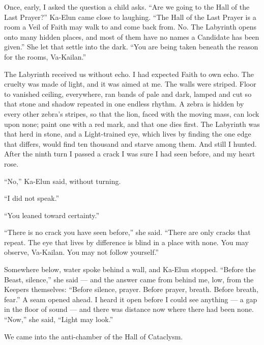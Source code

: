 Once, early, I asked the question a child asks. ``Are we going to the Hall of the Last Prayer?'' Ka-Elun came close to laughing. ``The Hall of the Last Prayer is a room a Veil of Faith may walk to and come back from. No. The Labyrinth opens onto many hidden places, and most of them have no names a Candidate has been given.'' She let that settle into the dark. ``You are being taken beneath the reason for the rooms, Va-Kailan.''\par
 
The Labyrinth received us without echo. I had expected Faith to own echo. The cruelty was made of light, and it was aimed at me. The walls were striped. Floor to vanished ceiling, everywhere, ran bands of pale and dark, lamped and cut so that stone and shadow repeated in one endless rhythm. A zebra is hidden by every other zebra's stripes, so that the lion, faced with the moving mass, can lock upon none; paint one with a red mark, and that one dies first. The Labyrinth was that herd in stone, and a Light-trained eye, which lives by finding the one edge that differs, would find ten thousand and starve among them. And still I hunted. After the ninth turn I passed a crack I was sure I had seen before, and my heart rose.\par
 
``No,'' Ka-Elun said, without turning.\par
 
``I did not speak.''\par
 
``You leaned toward certainty.''\par
 
``There is no crack you have seen before,'' she said. ``There are only cracks that repeat. The eye that lives by difference is blind in a place with none. You may observe, Va-Kailan. You may not follow yourself.''\par
 
Somewhere below, water spoke behind a wall, and Ka-Elun stopped. ``Before the Beast, silence,'' she said --- and the answer came from behind me, low, from the Keepers themselves: ``Before silence, prayer. Before prayer, breath. Before breath, fear.'' A seam opened ahead. I heard it open before I could see anything --- a gap in the floor of sound --- and there was distance now where there had been none. ``Now,'' she said, ``Light may look.''\par
 
We came into the anti-chamber of the Hall of Cataclysm.\par
 
